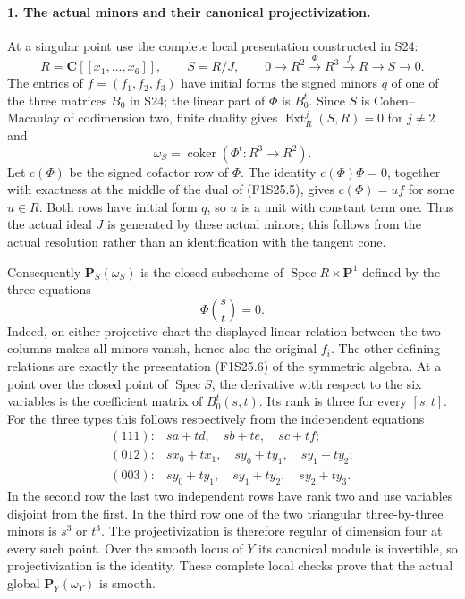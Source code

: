 \paragraph{1. The actual minors and their canonical projectivization.}
At a singular point use the complete local presentation constructed
in S24:
\[
 R=\mathbf C[[x_1,\ldots,x_6]],\qquad S=R/J,\qquad
 0\longrightarrow R^2\xrightarrow{\Phi}R^3
      \xrightarrow{f}R\longrightarrow S\longrightarrow0.
 \tag{F1S25.5}
\]
The entries of $f=(f_1,f_2,f_3)$ have initial forms the signed
minors $q$ of one of the three matrices $B_0$ in S24; the linear
part of $\Phi$ is $B_0^t$. Since $S$ is Cohen--Macaulay of
codimension two, finite duality gives
$\operatorname{Ext}_R^j(S,R)=0$ for $j\ne2$ and
\[
 \omega_S=\operatorname{coker}(\Phi^t:R^3\to R^2).
 \tag{F1S25.6}
\]
Let $c(\Phi)$ be the signed cofactor row of $\Phi$. The identity
$c(\Phi)\Phi=0$, together with exactness at the middle of the
dual of (F1S25.5), gives $c(\Phi)=u f$ for some $u\in R$.
Both rows have initial form $q$, so $u$ is a unit with constant
term one. Thus the actual ideal $J$ is generated by these actual
minors; this follows from the actual resolution rather than an
identification with the tangent cone.

Consequently $\mathbf P_S(\omega_S)$ is the closed subscheme of
$\operatorname{Spec}R\times\mathbf P^1$ defined by the three
equations
\[
                       \Phi\binom{s}{t}=0.
 \tag{F1S25.7}
\]
Indeed, on either projective chart the displayed linear relation
between the two columns makes all minors vanish, hence also the
original $f_i$. The other defining relations are exactly the
presentation (F1S25.6) of the symmetric algebra.
At a point over the closed point of $\operatorname{Spec}S$, the
derivative with respect to the six variables is the coefficient
matrix of $B_0^t(s,t)$. Its rank is three for every $[s:t]$.
For the three types this follows respectively from the independent
equations
\[
\begin{array}{ll}
 (111):& sa+td,\quad sb+te,\quad sc+tf;\\
 (012):& sx_0+tx_1,\quad sy_0+ty_1,\quad sy_1+ty_2;\\
 (003):& sy_0+ty_1,\quad sy_1+ty_2,\quad sy_2+ty_3.
\end{array}
 \tag{F1S25.8}
\]
In the second row the last two independent rows have rank two
and use variables disjoint from the first. In the third row one
of the two triangular three-by-three minors is $s^3$ or $t^3$.
The projectivization is therefore regular of dimension four at
every such point. Over the smooth locus of $Y$ its canonical
module is invertible, so projectivization is the identity. These
complete local checks prove that the actual global
$\mathbf P_Y(\omega_Y)$ is smooth.

